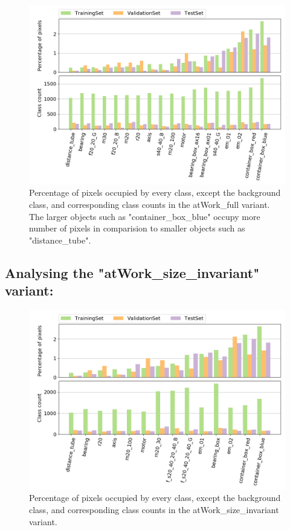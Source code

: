 			\begin{figure}[!htb]
			\centering
				\includegraphics[scale=0.5]{images/full_noB}
				\caption{Percentage of pixels occupied by every class, except the background class, and corresponding class counts in the atWork\_full variant. The larger objects such as "container\_box\_blue" occupy more number of pixels in comparision to smaller objects such as "distance\_tube".}
				\label{Fig:ana_full}
			\end{figure}
		
	\subsection{Analysing the "atWork\_size\_invariant" variant:}
		
		\begin{figure}[!htb]
		\centering
			\includegraphics[scale=0.5]{images/size_noB}
			\caption{Percentage of pixels occupied by every class, except the background class, and corresponding class counts in the atWork\_size\_invariant variant.}
			\label{Fig:ana_size}
		\end{figure}
		
